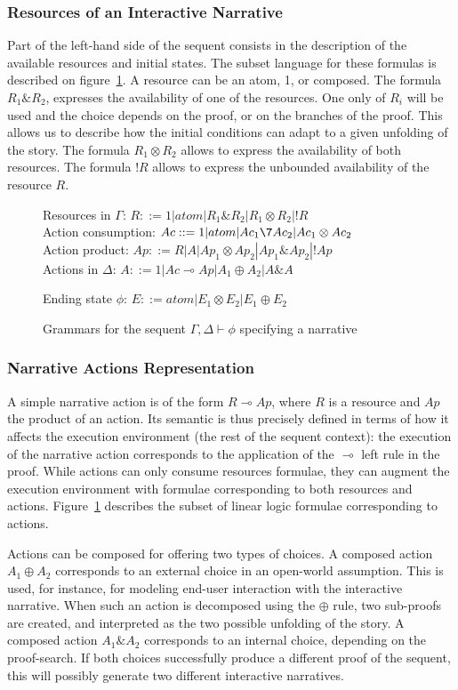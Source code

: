 \documentclass[runningheads,a4paper]{llncs}
\begin{document}
\subsubsection{Resources of an Interactive Narrative}
Part of the left-hand side of the sequent consists in the description of the available resources and initial states. The subset language for these formulas is described on figure~\ref{sequent_grammars}. A resource can be an atom, 1, or composed. The formula $R_{1}\&R_{2}$, expresses the availability of one of the resources. One only of $R_{i}$ will be used and the choice depends on the proof, or on the branches of the proof. This allows us to describe how the initial conditions can adapt to a given unfolding of the story. The formula $R_{1} \otimes R_{2}$ allows to express the availability of both resources. The formula $!R$ allows to express the unbounded availability of the resource $R$.
\begin{figure}
Resources in $\Gamma$: $R::= 1| atom | R_{1}\&R_{2} | R_{1} \otimes R_{2} | !R $\\
Action consumption: $Ac ::= 1 | atom | Ac_{1}\7Ac_{2} | Ac_{1} \otimes Ac_{2}$\\
Action product: $Ap::= R | A | Ap_{1} \otimes Ap_{2} | Ap_{1}\& Ap_{2} | !Ap$\\
Actions in $\Delta$: $A::= 1 | Ac \multimap Ap | A_{1} \oplus A_{2} | A\& A$

Ending state $\phi$: $E::= atom | E_{1} \otimes E_{2} | E_{1} \oplus E_{2}$
\caption{Grammars for the sequent $\Gamma , \Delta \vdash \phi$ specifying a narrative\label{sequent_grammars}}
\end{figure}
\subsubsection{Narrative Actions Representation}
A simple narrative action is of the form $R \multimap Ap$, where $R$ is a resource and $Ap$ the product of an action. Its semantic is thus precisely defined in terms of how it affects the execution environment (the rest of the sequent context): the execution of the narrative action corresponds to the application of the $\multimap$ left rule in the proof. While actions can only consume resources formulae, they can augment the execution environment with formulae corresponding to both resources and actions. Figure~\ref{sequent_grammars} describes the subset of linear logic formulae corresponding to actions.

Actions can be composed for offering two types of choices. A composed action $A_{1} \oplus A_{2}$ corresponds to an external choice in an open-world assumption. This is used, for instance, for modeling end-user interaction with the interactive narrative. When such an action is decomposed using the $\oplus$ rule, two sub-proofs are created, and interpreted as the two possible unfolding of the story. A composed action $A_{1} \& A_{2}$ corresponds to an internal choice, depending on the proof-search. If both choices successfully produce a different proof of the sequent, this will possibly generate two different interactive narratives.
\end{document}
